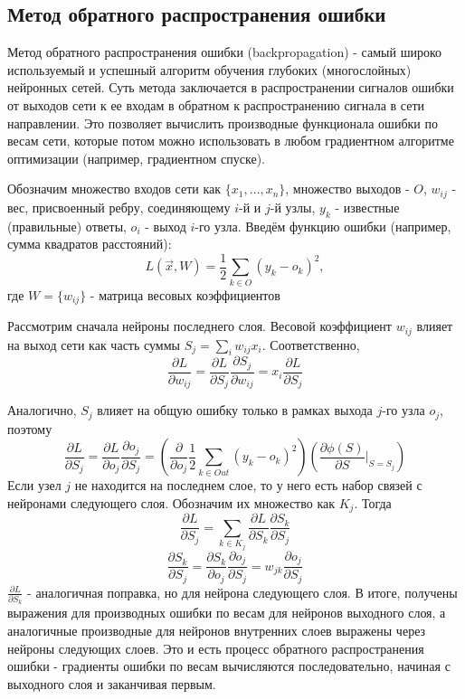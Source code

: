 	\subsection{Метод обратного распространения ошибки}
		Метод обратного распространения ошибки (backpropagation) - самый широко используемый и успешный алгоритм обучения глубоких (многослойных) нейронных сетей. Суть метода заключается в распространении сигналов ошибки от выходов сети к ее входам в обратном к распространению сигнала в сети направлении. Это позволяет вычислить производные функционала ошибки по весам сети, которые потом можно использовать в любом градиентном алгоритме оптимизации (например, градиентном спуске).
		
		Обозначим множество входов сети как $\{x_1, \ldots, x_n\}$, множество выходов - $O$, $w_{ij}$ - вес, присвоенный ребру, соединяющему $i$-й и $j$-й узлы, $y_k$ - известные (правильные) ответы, $o_i$ - выход $i$-го узла. Введём функцию ошибки (например, сумма квадратов расстояний):
		$$ L(\vec{x}, W) = \frac{1}{2} \sum_{k \in O} (y_k - o_k)^2, $$
		где $W = \{w_{ij}\}$ - матрица весовых коэффициентов
		
		Рассмотрим сначала нейроны последнего слоя. Весовой коэффициент $w_{ij}$ влияет на выход сети как часть суммы $S_j = \sum_i w_{ij} x_i$. Соответственно,
		$$ \frac{\partial L}{\partial w_{ij}} = \frac{\partial L}{\partial S_j} \frac{\partial S_j}{\partial w_{ij}} = x_i \frac{\partial L}{\partial S_j} $$
		
		Аналогично, $S_j$ влияет на общую ошибку только в рамках выхода $j$-го узла $o_j$, поэтому
		$$ \frac{\partial L}{\partial S_j} = \frac{\partial L}{\partial o_j} \frac{\partial o_j}{\partial S_j}  = \left(\frac{\partial}{\partial o_j} \frac{1}{2} \sum_{k \in Out} (y_k - o_k)^2 \right) \left(\frac{\partial \phi(S)}{\partial S} \bigg|_{S = S_j} \right)$$
		Если узел $j$ не находится на последнем слое, то у него есть набор связей с нейронами следующего слоя. Обозначим их множество как $K_j$. Тогда
		$$ \frac{\partial L}{\partial S_j} = \sum_{k \in K_j} \frac{\partial L}{\partial S_k} \frac{\partial S_k}{\partial S_j} $$
		$$ \frac{\partial S_k}{\partial S_j} = \frac{\partial S_k}{\partial o_j} \frac{\partial o_j}{\partial S_j} = w_{jk}\frac{\partial o_j}{\partial S_j} $$
		$ \frac{\partial L}{\partial S_k}$ - аналогичная поправка, но для нейрона следующего слоя. В итоге, получены выражения для производных ошибки по весам для нейронов выходного слоя, а аналогичные производные для нейронов внутренних слоев выражены через нейроны следующих слоев. Это и есть процесс обратного распространения ошибки - градиенты ошибки по весам вычисляются последовательно, начиная с выходного слоя и заканчивая первым.
